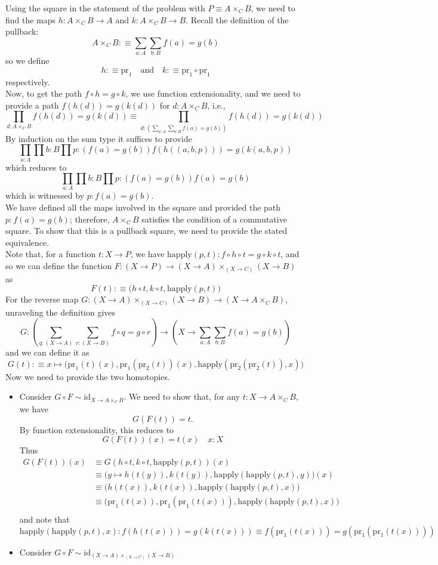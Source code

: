 \documentclass[14pt]{extarticle}
\newcommand{\0}{{\mathbf 0}}
\newcommand{\1}{{\mathbf 1}}
\newcommand{\2}{{\mathbf 2}}
\newcommand{\mt}{\mapsto}
\newcommand{\pr}{\mathrm{pr}}
\newcommand{\id}{\mathrm{id}}
\newcommand{\happly}{\mathrm{happly}}
\newcommand{\quadt}[1]{\quad \text{#1} \quad}
\begin{document}
Using the square in the statement of the problem with $P \equiv A \times_C B$, we need to find the maps $h : A \times_C B \to A$ and $k : A \times_C B \to B$. Recall the definition of the pullback:
\[A \times_C B :\equiv \sum_{a:A}\sum_{b:B} f(a) = g(b)\] so we define
\[h :\equiv \pr_1 \quadt{and} k :\equiv \pr_1 \circ \pr_1\] respectively.\\
Now, to get the path $f \circ h = g \circ k$, we use function extensionality, and we need to provide a path $f(h(d)) = g(k(d))$ for $d : A \times_C B$, i.e.,
\[\prod_{d : A \times_C B}f(h(d)) = g(k(d)) \equiv \prod_{d : \left(\sum_{a:A}\sum_{b:B} f(a) = g(b)\right)}f(h(d)) = g(k(d))\]
By induction on the sum type it suffices to provide
\[\prod_{a:A}\prod{b:B}\prod{p:(f(a) = g(b))} f(h((a,b,p))) = g(k(a,b,p))\] which reduces to 
\[\prod_{a:A}\prod{b:B}\prod{p:(f(a) = g(b))} f(a) = g(b)\] which is witnessed by $p : f(a) = g(b)$.\\
We have defined all the maps involved in the square and provided the path $p : f(a) = g(b)$; therefore, $A \times_C B$ satisfies the condition of a commutative square. To show that this is a pullback square, we need to provide the stated equivalence.\\
Note that, for a function $t : X \to P$, we have $\happly(p,t) : f \circ h \circ t = g \circ k \circ t$, and so we can define the function $F : (X \to P) \to (X \to A) \times_{(X \to C)} (X \to B)$ as
\[F(t) :\equiv \Big(h \circ t, k \circ t, \happly(p,t) \Big)\]
For the reverse map $G : (X \to A) \times_{(X \to C)} (X \to B) \to (X \to A \times_C B)$, unraveling the definition gives
\[G : \left(\sum_{q : (X \to A)}\sum_{r : (X \to B)} f \circ q = g \circ r \right) \to \left(X \to \sum_{a:A}\sum_{b:B} f(a) = g(b)\right)\]
and we can define it as
\[G(t) :\equiv x \mt \Big(\pr_1(t)(x), \pr_1(\pr_2(t))(x), \happly(\pr_2(\pr_2(t)),x)\Big)\]
Now we need to provide the two homotopies.

\begin{itemize}
\item Consider $G \circ F \sim \id_{X \to A \times_C B}$. We need to show that, for any $t : X \to A \times_C B$, we have
\[G(F(t)) = t.\] By function extensionality, this reduces to
\[G(F(t))(x) = t(x) \quad x : X\]
Thus
\begin{align*}
G(F(t))(x) &\equiv G(h \circ t, k \circ t, \happly(p,t))(x) \\
&\equiv \Big(y \mt h(t(y)), k(t(y)),\happly(\happly(p,t),y) \Big)(x) \\
&\equiv \Big(h(t(x)), k(t(x)),\happly(\happly(p,t),x)\Big)\\
&\equiv \Big(\pr_1(t(x)), \pr_1(\pr_1(t(x))),\happly(\happly(p,t),x)\Big)\\
\end{align*}
and note that 
\[\happly(\happly(p,t),x) : f(h(t(x))) = g(k(t(x))) \equiv f(\pr_1(t(x))) = g(\pr_1(\pr_1(t(x))))\]

\item Consider $G \circ F \sim \id_{(X \to A) \times_{(X \to C)} (X \to B)}$

\end{itemize}
\end{document}

